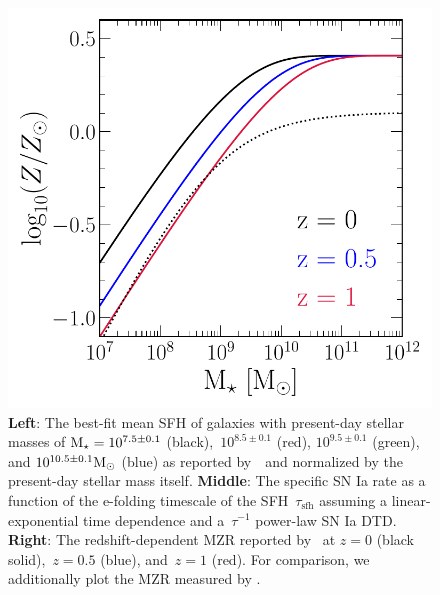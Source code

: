 \documentclass[ms.tex]{subfiles}
\begin{document}
\begin{figure}
\includegraphics[scale = 0.42]{mzr.pdf}
\caption{
\textbf{Left}: The best-fit mean SFH of galaxies with present-day stellar
masses of $\text{M}_\star = 10^{7.5 \pm 0.1}$ (black),~$10^{8.5 \pm 0.1}$ (red),
$10^{9.5 \pm 0.1}$ (green), and $10^{10.5 \pm 0.1} \text{M}_\odot$ (blue) as reported
by~\um~and normalized by the present-day stellar mass itself.
\textbf{Middle}: The specific SN Ia rate as a function of the e-folding
timescale of the SFH~$\tau_\text{sfh}$ assuming a linear-exponential time
dependence and a~$\tau^{-1}$ power-law SN Ia DTD.
\textbf{Right}: The redshift-dependent MZR reported by~\citet{Zahid2014} at
$z = 0$ (black solid),~$z = 0.5$ (blue), and~$z = 1$ (red).
For comparison, we additionally plot the MZR measured by
\citet[][black dotted, appropriate for~$z \approx 0$]{Andrews2013}.
}
\label{fig:sfh_mzr}
\end{figure}
\end{document}
